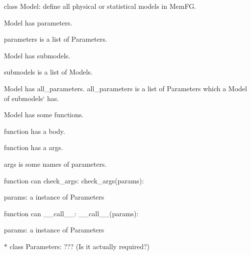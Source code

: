\begin{DoxyItemize}
\item class {\ttfamily Model}\+: define all physical or statistical models in Mem\+FG.
\begin{DoxyItemize}
\item {\ttfamily Model} has {\ttfamily parameters}.
\begin{DoxyItemize}
\item {\ttfamily parameters} is a {\ttfamily list} of {\ttfamily Parameter}s.
\end{DoxyItemize}
\item {\ttfamily Model} has {\ttfamily submodels}.
\begin{DoxyItemize}
\item {\ttfamily submodels} is a {\ttfamily list} of {\ttfamily Model}s.
\end{DoxyItemize}
\item {\ttfamily Model} has {\ttfamily all\+\_\+parameters}. {\ttfamily all\+\_\+parameters} is a list of {\ttfamily Parameter}s which a {\ttfamily Model} of submodels` has.
\item {\ttfamily Model} has some {\ttfamily function}s.
\begin{DoxyItemize}
\item {\ttfamily function} has a {\ttfamily body}.
\item {\ttfamily function} has a {\ttfamily args}.
\begin{DoxyItemize}
\item {\ttfamily args} is some {\ttfamily names} of {\ttfamily parameters}.
\end{DoxyItemize}
\item {\ttfamily function} can {\ttfamily check\+\_\+args}\+: {\ttfamily check\+\_\+args(params)}\+:
\begin{DoxyItemize}
\item params\+: a instance of {\ttfamily Parameters}
\end{DoxyItemize}
\item {\ttfamily function} can {\ttfamily \+\_\+\+\_\+call\+\_\+\+\_\+}\+: {\ttfamily \+\_\+\+\_\+call\+\_\+\+\_\+(params)}\+:
\begin{DoxyItemize}
\item params\+: a instance of {\ttfamily Parameters}
\end{DoxyItemize}
\end{DoxyItemize}
\end{DoxyItemize}
\item $\ast$ class {\ttfamily Parameters}\+: ??? (Is it actually required?)

\end{DoxyItemize}

